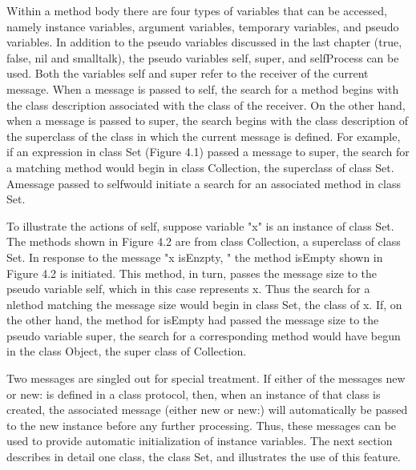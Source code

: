 Within a method body there are four types of variables that can be
accessed, namely instance variables, argument variables, temporary variables, and pseudo variables. In addition to the pseudo variables discussed
in the last chapter (true, false, nil and smalltalk), the pseudo variables
self, super, and selfProcess can be used. Both the variables self and super
refer to the receiver of the current message. When a message is passed to
self, the search for a method begins with the class description associated
with the class of the receiver. On the other hand, when a message is passed
to super, the search begins with the class description of the superclass of
the class in which the current message is defined. For example, if an
expression in class Set (Figure 4.1) passed a message to super, the search
for a matching method would begin in class Collection, the superclass of
class Set. Amessage passed to selfwould initiate a search for an associated
method in class Set.

To illustrate the actions of self, suppose variable "x" is an instance of
class Set. The methods shown in Figure 4.2 are from class Collection, a
superclass of class Set. In response to the message "x isEnzpty, " the method
isEmpty shown in Figure 4.2 is initiated. This method, in turn, passes the
message size to the pseudo variable self, which in this case represents x.
Thus the search for a nlethod matching the message size would begin in
class Set, the class of x. If, on the other hand, the method for isEmpty had
passed the message size to the pseudo variable super, the search for a
corresponding method would have begun in the class Object, the super
class of Collection.

Two messages are singled out for special treatment. If either of the
messages new or new: is defined in a class protocol, then, when an instance
of that class is created, the associated message (either new or new:) will
automatically be passed to the new instance before any further processing.
Thus, these messages can be used to provide automatic initialization of
instance variables. The next section describes in detail one class, the class
Set, and illustrates the use of this feature.




\secup


